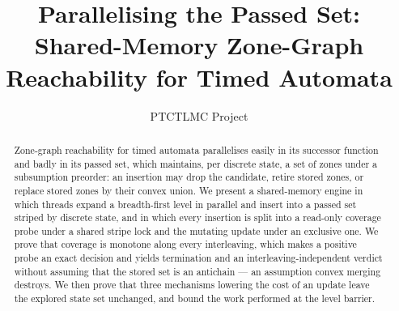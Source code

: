 \documentclass[runningheads]{llncs}
\title{Parallelising the Passed Set:\\
  Shared-Memory Zone-Graph Reachability for Timed Automata}
\author{PTCTLMC Project}
\institute{Anonymous Submission}
\begin{document}
\maketitle

\begin{abstract}
Zone-graph reachability for timed automata parallelises easily in its successor
function and badly in its passed set, which maintains, per discrete state, a set
of zones under a subsumption preorder: an insertion may drop the candidate,
retire stored zones, or replace stored zones by their convex union.  We present a
shared-memory engine in which threads expand a breadth-first level in parallel
and insert into a passed set striped by discrete state, and in which every
insertion is split into a read-only coverage probe under a shared stripe lock and
the mutating update under an exclusive one.  We prove that coverage is monotone
along every interleaving, which makes a positive probe an exact decision and
yields termination and an interleaving-independent verdict without assuming that
the stored set is an antichain --- an assumption convex merging destroys.  We
then prove that three mechanisms lowering the cost of an update leave the
explored state set unchanged, and bound the work performed at the level barrier.
\end{abstract}












\end{document}
